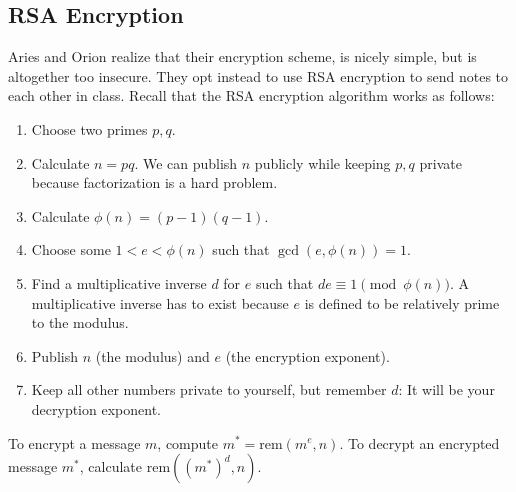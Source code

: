 \documentclass[12pt,letterpaper]{article}
\begin{document}
  \subsection*{RSA Encryption}
    Aries and Orion realize that their encryption scheme, is nicely simple, but is altogether
    too insecure. They opt instead to use RSA encryption to send notes to each other
in class. Recall that the RSA encryption algorithm works as follows:
\begin{enumerate}[1. ]
    \item Choose two primes $p, q$.
    \item Calculate $n = pq$. We can publish $n$ publicly while keeping $p, q$ private because factorization is a hard problem.
    \item Calculate $\phi(n) = (p - 1)(q -1)$.
    \item Choose some $1 < e < \phi(n)$ such that $\gcd(e, \phi(n)) = 1$.
    \item Find a multiplicative inverse $d$ for $e$ such that $de \equiv 1 \pmod{\phi(n)}$. A multiplicative inverse has to exist because $e$ is defined to be relatively prime to the modulus.
    \item Publish $n$ (the modulus) and $e$ (the encryption exponent).
    \item Keep all other numbers private to yourself, but remember $d$: It will be your decryption exponent.
\end{enumerate}

To encrypt a message $m$, compute $m^* = \textrm{rem}(m^e, n)$. To decrypt an encrypted message $m^*$, calculate $\textrm{rem}((m^*)^d,  n)$.
\newpage
\end{document}
